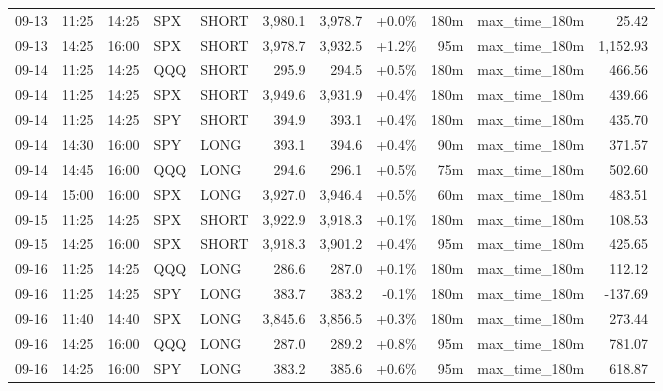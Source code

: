 \documentclass[11pt,a4paper,twoside]{article}
\begin{document}
\begin{center}
\begin{longtable}{>{\color{txtmain}}l l l l l r r r r >{\color{txtmain}}l r}
09-13 & 11:25 & 14:25 & SPX & SHORT & 3,980.1 & 3,978.7 & \textcolor{wingreen}{+0.0\%} & 180m & max\_time\_180m & \textcolor{wingreen}{25.42} \\
09-13 & 14:25 & 16:00 & SPX & SHORT & 3,978.7 & 3,932.5 & \textcolor{wingreen}{+1.2\%} & 95m & max\_time\_180m & \textcolor{wingreen}{1,152.93} \\
09-14 & 11:25 & 14:25 & QQQ & SHORT & 295.9 & 294.5 & \textcolor{wingreen}{+0.5\%} & 180m & max\_time\_180m & \textcolor{wingreen}{466.56} \\
09-14 & 11:25 & 14:25 & SPX & SHORT & 3,949.6 & 3,931.9 & \textcolor{wingreen}{+0.4\%} & 180m & max\_time\_180m & \textcolor{wingreen}{439.66} \\
09-14 & 11:25 & 14:25 & SPY & SHORT & 394.9 & 393.1 & \textcolor{wingreen}{+0.4\%} & 180m & max\_time\_180m & \textcolor{wingreen}{435.70} \\
09-14 & 14:30 & 16:00 & SPY & LONG & 393.1 & 394.6 & \textcolor{wingreen}{+0.4\%} & 90m & max\_time\_180m & \textcolor{wingreen}{371.57} \\
09-14 & 14:45 & 16:00 & QQQ & LONG & 294.6 & 296.1 & \textcolor{wingreen}{+0.5\%} & 75m & max\_time\_180m & \textcolor{wingreen}{502.60} \\
09-14 & 15:00 & 16:00 & SPX & LONG & 3,927.0 & 3,946.4 & \textcolor{wingreen}{+0.5\%} & 60m & max\_time\_180m & \textcolor{wingreen}{483.51} \\
09-15 & 11:25 & 14:25 & SPX & SHORT & 3,922.9 & 3,918.3 & \textcolor{wingreen}{+0.1\%} & 180m & max\_time\_180m & \textcolor{wingreen}{108.53} \\
09-15 & 14:25 & 16:00 & SPX & SHORT & 3,918.3 & 3,901.2 & \textcolor{wingreen}{+0.4\%} & 95m & max\_time\_180m & \textcolor{wingreen}{425.65} \\
09-16 & 11:25 & 14:25 & QQQ & LONG & 286.6 & 287.0 & \textcolor{wingreen}{+0.1\%} & 180m & max\_time\_180m & \textcolor{wingreen}{112.12} \\
09-16 & 11:25 & 14:25 & SPY & LONG & 383.7 & 383.2 & \textcolor{lossred}{-0.1\%} & 180m & max\_time\_180m & \textcolor{lossred}{-137.69} \\
09-16 & 11:40 & 14:40 & SPX & LONG & 3,845.6 & 3,856.5 & \textcolor{wingreen}{+0.3\%} & 180m & max\_time\_180m & \textcolor{wingreen}{273.44} \\
09-16 & 14:25 & 16:00 & QQQ & LONG & 287.0 & 289.2 & \textcolor{wingreen}{+0.8\%} & 95m & max\_time\_180m & \textcolor{wingreen}{781.07} \\
09-16 & 14:25 & 16:00 & SPY & LONG & 383.2 & 385.6 & \textcolor{wingreen}{+0.6\%} & 95m & max\_time\_180m & \textcolor{wingreen}{618.87} \\

\end{longtable}
\end{center}
\end{document}
